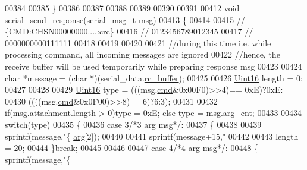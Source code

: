 \begin{DoxyCode}
00384 
00385 \}
00386 
00387 
00388 
00389 
00390 
00391 
\hypertarget{a00030_source_l00412}{}\hyperlink{a00030_a96a3f016ca5b0736424c2695fe9fbdf8}{00412} \textcolor{keywordtype}{void}   \hyperlink{a00030_a96a3f016ca5b0736424c2695fe9fbdf8}{serial\_send\_response}(\hyperlink{a00031_d3/d4f/a00761}{serial\_msg\_t} msg)
00413 \{
00414   
00415     \textcolor{comment}{// \{CMD:CHSN00000000....:crc\}}
00416     \textcolor{comment}{// 0123456789012345}
00417     \textcolor{comment}{// 0000000000111111}
00418 
00419 
00420 
00421    \textcolor{comment}{//during this time i.e. while processing command, all incoming messages are ignored}
00422    \textcolor{comment}{//hence, the receive buffer will be used temporarily while preparing response msg}
00423 
00424    \textcolor{keywordtype}{char}   *message = (\textcolor{keywordtype}{char} *)(serial\_data.\hyperlink{a00030_ac734cb8be27f86bd99edc539434883a4}{rc\_buffer});
00425 
00426    \hyperlink{a00072_a59a9f6be4562c327cbfb4f7e8e18f08b}{Uint16}  length = 0;
00427 
00428 
00429   \hyperlink{a00072_a59a9f6be4562c327cbfb4f7e8e18f08b}{Uint16} type =  (((msg.\hyperlink{a00031_a13c351e37c82b2434e5ce4421012ffd6}{cmd}&0x00F0)>>4)== 0xE)?0xE:
00430                  ((((msg.\hyperlink{a00031_a13c351e37c82b2434e5ce4421012ffd6}{cmd}&0x0F00)>>8)==6)?6:3);
00431 
00432  \textcolor{keywordflow}{if}(msg.\hyperlink{a00031_a040f6d5d58d18d8aeaf447eda7f50172}{attachment}.length > 0)type = 0xE; \textcolor{keywordflow}{else} type = msg.\hyperlink{a00031_a7b79f40e2eeec288091afd340bf8f591}{arg\_cnt};
00433 
00434  \textcolor{keywordflow}{switch}(type)
00435    \{
00436        \textcolor{keywordflow}{case} 3\textcolor{comment}{/*3 arg msg*/}:
00437        \{
00438 
00439        sprintf(message,\textcolor{stringliteral}{"\{%
      \hyperlink{a00031_af7d6f762438c80072bd9dc0e4dd4ae1e}{arg}[2]);
00440 
00441        sprintf(message+15,\textcolor{stringliteral}{"%
00442 
00443        length = 20;
00444        \}\textcolor{keywordflow}{break};
00445 
00446 
00447        \textcolor{keywordflow}{case} 4\textcolor{comment}{/*4 arg msg*/}:
00448        \{    sprintf(message,\textcolor{stringliteral}{"\{%
}}}
\end{DoxyCode}
